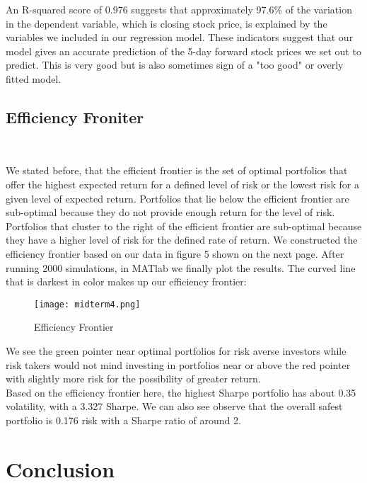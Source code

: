 \documentclass[11pt, oneside]{article}   	%
\begin{document}
An R-squared score of 0.976 suggests that approximately 97.6\% of the variation in the dependent variable, which is closing stock price, is explained by the variables we included in our regression model. These indicators suggest that our model gives an accurate prediction of the 5-day forward stock prices we set out to predict. This is very good but is also sometimes sign of a "too good" or overly fitted model.

\subsection{Efficiency Froniter}\

We stated before, that the efficient frontier is the set of optimal portfolios that offer the highest expected return for a defined level of risk or the lowest risk for a given level of expected return. Portfolios that lie below the efficient frontier are sub-optimal because they do not provide enough return for the level of risk. Portfolios that cluster to the right of the efficient frontier are sub-optimal because they have a higher level of risk for the defined rate of return. We constructed the efficiency frontier based on our data in figure 5 shown on the next page. After running 2000 simulations, in MATlab we finally plot the results. The curved line that is darkest in color makes up our efficiency frontier: 

\begin{figure}[! h] %
   \centering
   \texttt{[image: midterm4.png]} 
   \caption{Efficiency Frontier}
\end{figure}

\FloatBarrier

We see the green pointer near optimal portfolios for risk averse investors while risk takers would not mind investing in portfolios near or above the red pointer with slightly more risk for the possibility of greater return. \\

Based on the efficiency frontier here, the highest Sharpe portfolio has about 0.35 volatility, with a 3.327 Sharpe. We can also see observe that the overall safest portfolio is 0.176 risk with a Sharpe ratio of around 2.

\newpage

\section{Conclusion}\
\end{document}
